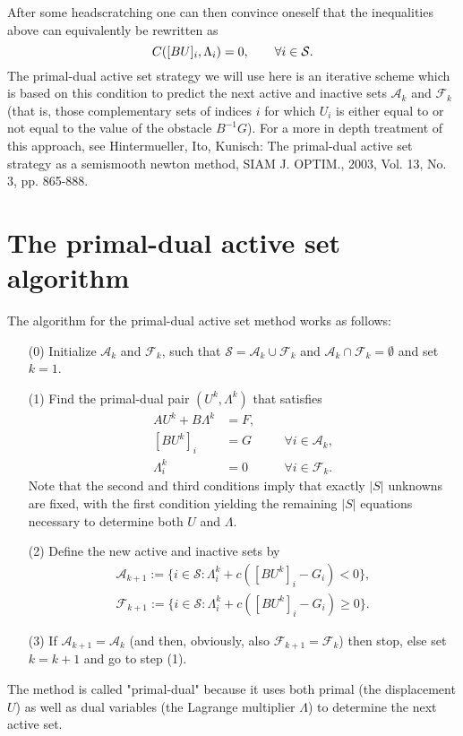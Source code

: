 \documentclass{article}
\begin{document}
After some headscratching one can then convince oneself that the inequalities
above can equivalently be rewritten as
\begin{equation*}
 C([BU]_i,\Lambda_i) = 0, \qquad \forall i\in{\cal S}.
\end{equation*}
The primal-dual active set strategy we will use here is an iterative scheme which is based on
this condition to predict the next active and inactive sets $\mathcal{A}_k$ and
$\mathcal{F}_k$ (that is, those complementary sets of indices $i$ for which
$U_i$ is either equal to or not equal to the value of the obstacle
$B^{-1}G$). For a more in depth treatment of this approach, see Hintermueller, Ito, Kunisch: The primal-dual active set
strategy as a semismooth newton method, SIAM J. OPTIM., 2003, Vol. 13, No. 3,
pp. 865-888.

\section{The primal-dual active set algorithm}

The algorithm for the primal-dual active set method works as follows:
\begin{itemize}
 \item [(0)] Initialize $\mathcal{A}_k$ and $\mathcal{F}_k$, such that $\mathcal{S}=\mathcal{A}_k\cup\mathcal{F}_k$ and $\mathcal{A}_k\cap\mathcal{F}_k=\emptyset$ and set $k=1$.
 \item [(1)] Find the primal-dual pair $(U^k,\Lambda^k)$ that satisfies
 \begin{align*}
  AU^k + B\Lambda^k &= F,\\
  [BU^k]_i &= G\quad&&\forall i\in\mathcal{A}_k,\\
  \Lambda_i^k &= 0\quad&&\forall i\in\mathcal{F}_k.
 \end{align*}
 Note that the second and third conditions imply that exactly $|S|$ unknowns
 are fixed, with the first condition yielding the remaining $|S|$ equations
 necessary to determine both $U$ and $\Lambda$.
 \item [(2)] Define the new active and inactive sets by
 \begin{equation*}
 \begin{split}
  \mathcal{A}_{k+1}:=\lbrace i\in\mathcal{S}:\Lambda^k_i + c([BU^k]_i - G_i)< 0\rbrace,\\
  \mathcal{F}_{k+1}:=\lbrace i\in\mathcal{S}:\Lambda^k_i + c([BU^k]_i - G_i)\geq 0\rbrace.
 \end{split}
 \end{equation*}
 \item [(3)] If $\mathcal{A}_{k+1}=\mathcal{A}_k$ (and then, obviously, also $\mathcal{F}_{k+1}=\mathcal{F}_k$) then stop, else set $k=k+1$ and go to step (1).
\end{itemize}
The method is called "primal-dual" because it uses both primal (the
displacement $U$) as well as dual variables (the Lagrange multiplier
$\Lambda$) to determine the next active set.
\end{document}
